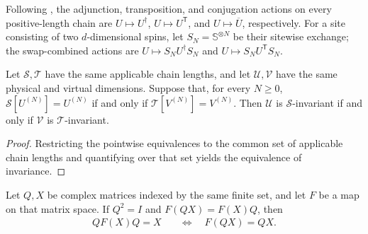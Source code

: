 \begin{definition}
    \label{def:mpu_swap_comparison_symmetries}
    \leanok
    Following \cite[Sections~IV.A--IV.C]{Cirac2017MPU}, the adjunction,
    transposition, and conjugation actions on every positive-length chain
    are $U\mapsto U^\dagger$, $U\mapsto U^{\mathsf T}$, and
    $U\mapsto\overline U$, respectively. For a site consisting of two
    $d$-dimensional spins, let $S_N=\mathbb S^{\otimes N}$ be their sitewise
    exchange; the swap-combined actions are
    $U\mapsto S_NU^\dagger S_N$ and
    $U\mapsto S_NU^{\mathsf T}S_N$.
\end{definition}

\begin{lemma}
    \label{thm:mpu_pointwise_symmetry_invariance_comparison}
    \leanok
    Let $\mathcal S,\mathcal T$ have the same applicable chain lengths,
    and let $\mathcal U,\mathcal V$ have the same physical and virtual
    dimensions. Suppose that, for every $N\geq0$,
    $\mathcal S[U^{(N)}]=U^{(N)}$ if and only if
    $\mathcal T[V^{(N)}]=V^{(N)}$. Then $\mathcal U$ is
    $\mathcal S$-invariant if and only if $\mathcal V$ is
    $\mathcal T$-invariant.
\end{lemma}

\begin{proof}\leanok
    Restricting the pointwise equivalences to the common set of applicable
    chain lengths and quantifying over that set yields the equivalence of
    invariance.
\end{proof}

\begin{lemma}
    \label{thm:mpu_involution_combined_fixed_equation}
    \leanok
    Let $Q,X$ be complex matrices indexed by the same finite set, and let
    $F$ be a map on that matrix space. If $Q^2=I$ and
    $F(QX)=F(X)Q$, then
    \begin{align}
        QF(X)Q=X
         & \quad\Longleftrightarrow\quad F(QX)=QX.
        \label{eq:mpu_involution_combined_fixed}
    \end{align}
\end{lemma}

